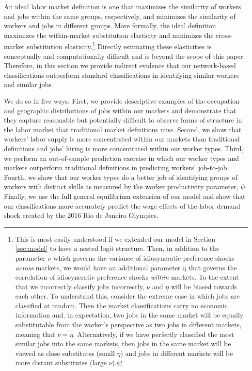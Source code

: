 \documentclass[12pt]{article}
\theoremstyle{definition}
\theoremstyle{plain}
\begin{document}
An ideal labor market definition is one that maximizes the similarity of workers and jobs within the same groups, respectively, and minimizes the similarity of workers and jobs in different groups. More formally, the ideal definition maximizes the within-market substitution elasticity and minimizes the cross-market substitution elasticity.\footnote{This is most easily understood if we extended our model in Section \ref{sec:model} to have a nested logit structure. Then, in addition to the parameter $\nu$ which governs the variance of idiosyncratic preference shocks \emph{across} markets, we would have an additional parameter $\eta$ that governs the correlation of idiosyncratic preference shocks \emph{within} markets. To the extent that we incorrectly classify jobs incorrectly, $\nu$ and $\eta$ will be biased towards each other. To understand this, consider the extreme case in which jobs are classified at random. Then the market classifications carry no economic information and, in expectation, two jobs in the same market will be equally substitutable from the worker's perspective as two jobs in different markets, meaning that $\nu=\eta$. Alternatively, if we have perfectly classified the most similar jobs into the same markets, then jobs in the same market will be viewed as close substitutes (small $\eta$) and jobs in different markets will be more distant substitutes (large $\nu$). } Directly estimating these elasticities is conceptually and computationally difficult and is beyond the scope of this paper. Therefore, in this section we provide indirect evidence that our network-based classifications outperform standard classifications in identifying similar workers and similar jobs. 

We do so in five ways. First, we provide descriptive examples of the occupation and geographic distributions of jobs within our markets and demonstrate that they capture reasonable but potentially difficult to observe forms of structure in the labor market that traditional market definitions miss. Second, we show that workers' labor supply is more concentrated  within our markets than traditional definitions and jobs' hiring is more concentrated within our worker types. Third, we perform an out-of-sample prediction exercise in which our worker types and markets outperform traditional definitions in predicting workers' job-to-job. Fourth, we show that our worker types do a better job of identifying groups of workers with distinct skills as measured by the worker productivity parameter, $\psi$. Finally, we use the full general equilibrium extension of our model and show that our classifications more accurately predict the wage effects of the labor demand shock created by the 2016 Rio de Janeiro Olympics. 
\end{document}
